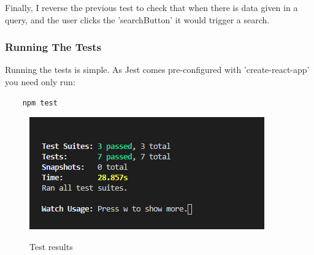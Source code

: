 Finally, I reverse the previous test to check that when there is data given in a query, and the user clicks the 'searchButton' it would trigger a search.

\subsubsection{Running The Tests}
Running the tests is simple. As Jest comes pre-configured with 'create-react-app' you need only run:

\begin{verbatim}
    npm test
\end{verbatim}
\begin{figure}[ht]
    \centering
    \includegraphics[scale=0.9]{Images/test2.png} 
    \label{test2_label}
    \caption{Test results}
\end{figure}